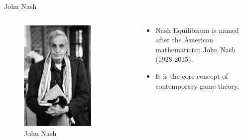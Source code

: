 \documentclass[
  14pt,
  letterpaper,
  ignorenonframetext,
  aspectratio=169,
]{beamer}
\providecommand{\tightlist}{%
  \setlength{\itemsep}{0pt}\setlength{\parskip}{0pt}}\usepackage{longtable,booktabs,array}
\let\olditem\item
\renewcommand{\item}{%
\olditem\vspace{6pt}}
\begin{document}
\begin{frame}{John Nash}
\protect\hypertarget{john-nash-1}{}
\begin{columns}[c]
\begin{column}{0.48\textwidth}
\begin{figure}

{\centering \includegraphics[width=0.75\textwidth,height=0.75\textheight]{images/nash.jpg}

}

\caption{John Nash}

\end{figure}
\end{column}

\begin{column}{0.48\textwidth}
\begin{itemize}[<+->]
\tightlist
\item
  Nash Equilibrium is named after the American mathematician John Nash
  (1928-2015).
\item
  It is the core concept of contemporary game theory.
\end{itemize}
\end{column}
\end{columns}
\end{frame}
\end{document}
